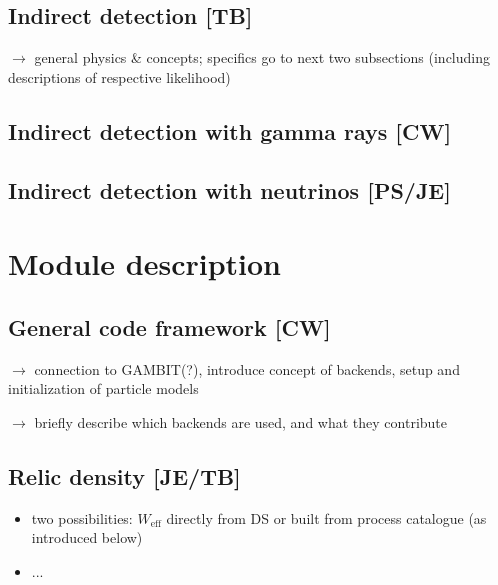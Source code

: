 \subsection{Indirect detection {\bf [TB]}}
\label{phys_id}

$\to$ general physics \& concepts; specifics go to next two subsections 
(including descriptions of respective likelihood)

\subsection{Indirect detection with gamma rays {\bf [CW]}}
\label{phys_ga}

\subsection{Indirect detection with neutrinos {\bf [PS/JE]}}
\label{phys_nu}




\section{Module description}
\label{code}


\subsection{General code framework {\bf [CW]}}
\label{code_gen}

$\to$ connection to GAMBIT(?), introduce concept of backends, setup and initialization of particle models

\medskip
\noindent
$\to$ briefly describe which backends are used, and what they contribute 


\subsection{Relic density {\bf [JE/TB]}}
\label{code_rd}
\begin{itemize}
\item two possibilities: $W_\mathrm{eff}$ directly from DS or built from process catalogue (as introduced below)
\item...
\end{itemize}


